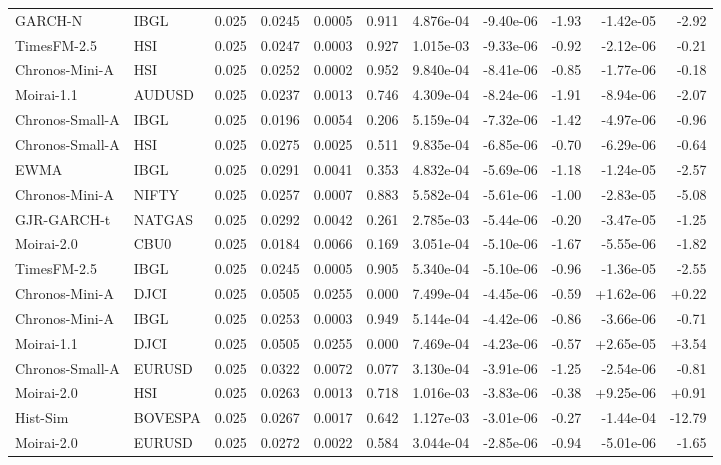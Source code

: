 \begin{tabular}{llrrrrrrrrr}
GARCH-N & IBGL & 0.025 & 0.0245 & 0.0005 & 0.911 & 4.876e-04 & -9.40e-06 & -1.93 & -1.42e-05 & -2.92 \\
TimesFM-2.5 & HSI & 0.025 & 0.0247 & 0.0003 & 0.927 & 1.015e-03 & -9.33e-06 & -0.92 & -2.12e-06 & -0.21 \\
Chronos-Mini-A & HSI & 0.025 & 0.0252 & 0.0002 & 0.952 & 9.840e-04 & -8.41e-06 & -0.85 & -1.77e-06 & -0.18 \\
Moirai-1.1 & AUDUSD & 0.025 & 0.0237 & 0.0013 & 0.746 & 4.309e-04 & -8.24e-06 & -1.91 & -8.94e-06 & -2.07 \\
Chronos-Small-A & IBGL & 0.025 & 0.0196 & 0.0054 & 0.206 & 5.159e-04 & -7.32e-06 & -1.42 & -4.97e-06 & -0.96 \\
Chronos-Small-A & HSI & 0.025 & 0.0275 & 0.0025 & 0.511 & 9.835e-04 & -6.85e-06 & -0.70 & -6.29e-06 & -0.64 \\
EWMA & IBGL & 0.025 & 0.0291 & 0.0041 & 0.353 & 4.832e-04 & -5.69e-06 & -1.18 & -1.24e-05 & -2.57 \\
Chronos-Mini-A & NIFTY & 0.025 & 0.0257 & 0.0007 & 0.883 & 5.582e-04 & -5.61e-06 & -1.00 & -2.83e-05 & -5.08 \\
GJR-GARCH-t & NATGAS & 0.025 & 0.0292 & 0.0042 & 0.261 & 2.785e-03 & -5.44e-06 & -0.20 & -3.47e-05 & -1.25 \\
Moirai-2.0 & CBU0 & 0.025 & 0.0184 & 0.0066 & 0.169 & 3.051e-04 & -5.10e-06 & -1.67 & -5.55e-06 & -1.82 \\
TimesFM-2.5 & IBGL & 0.025 & 0.0245 & 0.0005 & 0.905 & 5.340e-04 & -5.10e-06 & -0.96 & -1.36e-05 & -2.55 \\
Chronos-Mini-A & DJCI & 0.025 & 0.0505 & 0.0255 & 0.000 & 7.499e-04 & -4.45e-06 & -0.59 & +1.62e-06 & +0.22 \\
Chronos-Mini-A & IBGL & 0.025 & 0.0253 & 0.0003 & 0.949 & 5.144e-04 & -4.42e-06 & -0.86 & -3.66e-06 & -0.71 \\
Moirai-1.1 & DJCI & 0.025 & 0.0505 & 0.0255 & 0.000 & 7.469e-04 & -4.23e-06 & -0.57 & +2.65e-05 & +3.54 \\
Chronos-Small-A & EURUSD & 0.025 & 0.0322 & 0.0072 & 0.077 & 3.130e-04 & -3.91e-06 & -1.25 & -2.54e-06 & -0.81 \\
Moirai-2.0 & HSI & 0.025 & 0.0263 & 0.0013 & 0.718 & 1.016e-03 & -3.83e-06 & -0.38 & +9.25e-06 & +0.91 \\
Hist-Sim & BOVESPA & 0.025 & 0.0267 & 0.0017 & 0.642 & 1.127e-03 & -3.01e-06 & -0.27 & -1.44e-04 & -12.79 \\
Moirai-2.0 & EURUSD & 0.025 & 0.0272 & 0.0022 & 0.584 & 3.044e-04 & -2.85e-06 & -0.94 & -5.01e-06 & -1.65 \\

\end{tabular}
